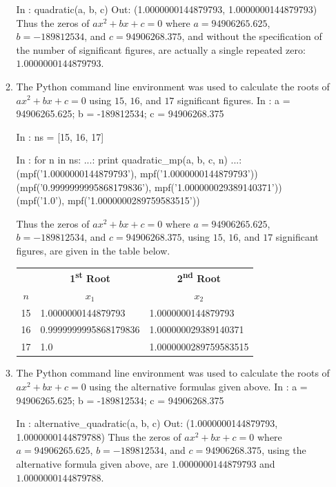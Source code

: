 \documentclass[12pt]{article}
\newenvironment{qv}
{\quote\Verbatim}
{\endVerbatim\endquote}
\begin{document}
\begin{enumerate}[\ (a)\ ]
\begin{enumerate}[\ (i) \ ]
\begin{qv}
In : quadratic(a, b, c)
Out: (1.0000000144879793, 1.0000000144879793)
\end{qv}
Thus the zeros of $ax^2 + bx + c = 0$ where $a = 94906265.625$, $b = -189812534$, and $c = 94906268.375$, and without the specification of the number of significant figures, are actually a single repeated zero: $\boxed{1.0000000144879793}$.

\item The Python command line environment was used to calculate the roots of $ax^2 + bx + c = 0$ using $15$, $16$, and $17$ significant figures.
\begin{qv}
In : a = 94906265.625; b = -189812534; c = 94906268.375

In : ns = [15, 16, 17]

In : for n in ns:
...:    print quadratic_mp(a, b, c, n)
...:
(mpf('1.0000000144879793'), mpf('1.0000000144879793'))
(mpf('0.9999999995868179836'), mpf('1.000000029389140371'))
(mpf('1.0'), mpf('1.0000000289759583515'))

\end{qv}
Thus the zeros of $ax^2 + bx + c = 0$ where $a = 94906265.625$, $b = -189812534$, and $c = 94906268.375$, using $15$, $16$, and $17$ significant figures, are given in the table below.
\begin{table}[H]
    \centering
    \begin{tabular}{|l|l|l|}
    & \multicolumn{1}{c|}{\bf 1\textsuperscript{st} Root} & \multicolumn{1}{c|}{\bf 2\textsuperscript{nd} Root}\\
    \multicolumn{1}{|c|}{$n$} & \multicolumn{1}{c|}{$x_1$} & \multicolumn{1}{c|}{$x_2$} \\ \hline
    15 & 1.0000000144879793 & 1.0000000144879793 \\ \hline
    16 & 0.9999999995868179836 & 1.000000029389140371\\ \hline
    17 & 1.0 & 1.0000000289759583515 \\ \hline
    \end{tabular}
\end{table}

\item The Python command line environment was used to calculate the roots of $ax^2 + bx + c = 0$ using the alternative formulas given above.
\begin{qv}
In : a = 94906265.625; b = -189812534; c = 94906268.375

In : alternative_quadratic(a, b, c)
Out: (1.0000000144879793, 1.0000000144879788)
\end{qv}
Thus the zeros of $ax^2 + bx + c = 0$ where $a = 94906265.625$, $b = -189812534$, and $c = 94906268.375$, using the alternative formula given above, are $\boxed{1.0000000144879793}$ and $\boxed{1.0000000144879788}$.


\end{enumerate}
\end{enumerate}
\end{document}
